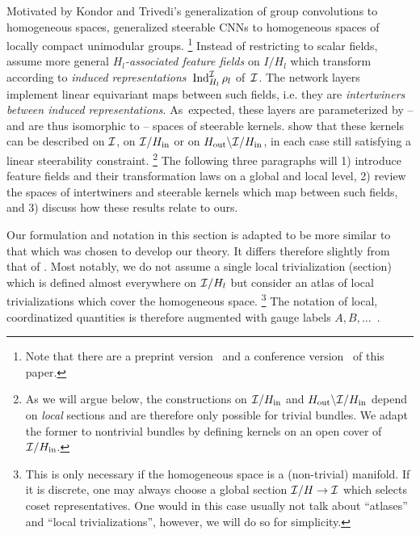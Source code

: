 Motivated by Kondor and Trivedi's \cite{Kondor2018-GENERAL} generalization of group convolutions to homogeneous spaces, \citet{Cohen2018-intertwiners}\cite{Cohen2019-generaltheory} generalized steerable CNNs to homogeneous spaces of locally compact unimodular groups.%
\footnote{
    Note that there are a preprint version~\cite{Cohen2018-intertwiners} and a conference version~\cite{Cohen2019-generaltheory} of this paper.
}
Instead of restricting to scalar fields, \citet{Cohen2018-intertwiners}\cite{Cohen2019-generaltheory} assume more general \emph{$H_l$-associated feature fields} on $I/H_l$ which transform according to \emph{induced representations}~$\operatorname{Ind}_{H_l}^{\mathcal{I}} \rho_l$ of~$\mathcal{I}$.
The network layers implement linear equivariant maps between such fields, i.e. they are \emph{intertwiners between induced representations}.
As~expected, these layers are parameterized by -- and are thus isomorphic to -- spaces of steerable kernels.
\citet{Cohen2018-intertwiners}\cite{Cohen2019-generaltheory} show that these kernels can be described on $\mathcal{I}$, on $\mathcal{I}/H_{\textup{in}}$ or on $H_{\textup{out}}\backslash \mathcal{I}/H_{\textup{in}}$, in each case still satisfying a linear steerability constraint.%
\footnote{
    As we will argue below, the constructions on $\mathcal{I}/H_{\textup{in}}$ and $H_{\textup{out}}\backslash \mathcal{I}/H_{\textup{in}}$ depend on \emph{local} sections and are therefore only possible for trivial bundles.
    We adapt the former to nontrivial bundles by defining kernels on an open cover of~$\mathcal{I}/H_{\textup{in}}$.
}
The following three paragraphs will
1) introduce feature fields and their transformation laws on a global and local level,
2) review the spaces of intertwiners and steerable kernels which map between such fields, and
3) discuss how these results relate to ours.

Our formulation and notation in this section is adapted to be more similar to that which was chosen to develop our theory.
It differs therefore slightly from that of \citet{Cohen2018-intertwiners}\cite{Cohen2019-generaltheory}.
Most notably, we do not assume a single local trivialization (section) which is defined almost everywhere on $\mathcal{I}/H_l$ but consider an atlas of local trivializations which cover the homogeneous space.%
\footnote{
    This is only necessary if the homogeneous space is a (non-trivial) manifold.
    If it is discrete, one may always choose a global section $\mathcal{I}/H \to \mathcal{I}$ which selects coset representatives.
    One would in this case usually not talk about ``atlases'' and ``local trivializations'', however, we will do so for simplicity.
}
The notation of local, coordinatized quantities is therefore augmented with gauge labels $A,B,\dots$ \,.





